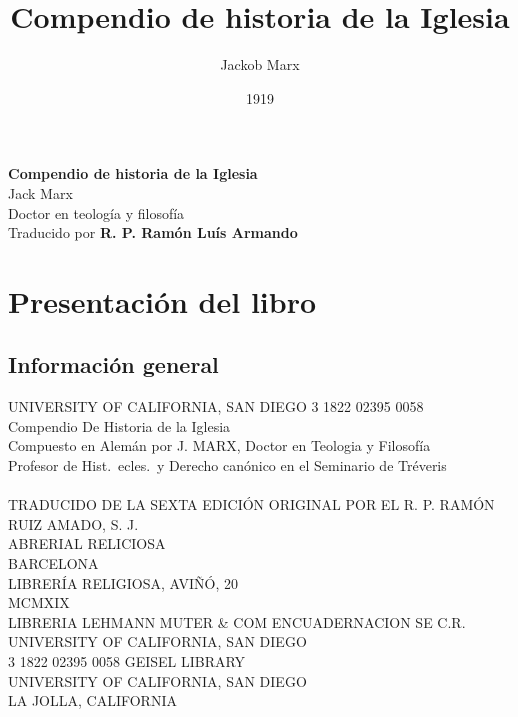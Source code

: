 \documentclass[12pt]{book}
\title{Compendio de historia de la Iglesia}
\author{Jackob Marx}
\date{1919}
\begin{document}
\begin{titlepage}
  \begin{center}
    {\Huge \textbf{Compendio de historia de la Iglesia} } \\
    \vspace{6mm}
    {\huge Jack Marx}\\
    \vspace{1mm}
    {Doctor en teología y filosofía}\\%
    \vspace{18cm}
    {\large Traducido por \textbf{R. P. Ramón Luís Armando}}

  \end{center}
\end{titlepage}
\tableofcontents %
\chapter{Presentación del libro}
\section{Información general}
\noindent UNIVERSITY OF CALIFORNIA, SAN DIEGO
3 1822 02395 0058\\
Compendio
De
Historia de la Iglesia\\
Compuesto en Alemán por
J. MARX, Doctor en Teologia y Filosofía\\
Profesor de Hist.\ ecles.\ y Derecho canónico en el Seminario de Tréveris\\\\
TRADUCIDO DE LA SEXTA EDICIÓN ORIGINAL
POR EL
R. P. RAMÓN RUIZ AMADO, S. J.\\
ABRERIAL RELICIOSA\\
BARCELONA\\
LIBRERÍA RELIGIOSA, AVIÑÓ, 20\\
MCMXIX\\[1em]
\noindent LIBRERIA LEHMANN MUTER \& COM ENCUADERNACION SE C.R.\\[1em]
\noindent UNIVERSITY OF CALIFORNIA, SAN DIEGO\\
3 1822 02395 0058
GEISEL LIBRARY\\
UNIVERSITY OF CALIFORNIA, SAN DIEGO\\
LA JOLLA, CALIFORNIA\\
\end{document}
